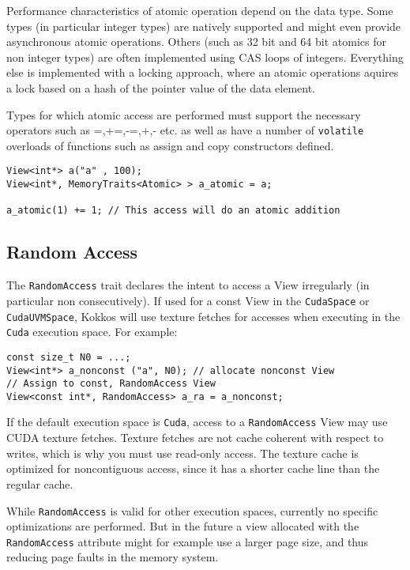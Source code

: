 Performance characteristics of atomic operation depend on the data type. 
Some types (in particular integer types) are natively supported and might even provide 
asynchronous atomic operations. Others (such as 32 bit and 64 bit atomics for non 
integer types) are often implemented using CAS loops of integers. 
Everything else is implemented with a locking approach, where an atomic operations 
aquires a lock based on a hash of the pointer value of the data element.  

Types for which atomic access are performed must support the 
necessary operators such as =,+=,-=,+,- etc. as well as have a number of \lstinline|volatile|
overloads of functions such as assign and copy constructors defined. 

\begin{lstlisting}
View<int*> a("a" , 100);
View<int*, MemoryTraits<Atomic> > a_atomic = a;

a_atomic(1) += 1; // This access will do an atomic addition
\end{lstlisting} 

\subsection{Random Access}

The \lstinline|RandomAccess| trait declares the intent to access a View
irregularly (in particular non consecutively). If used for a const View 
in the \lstinline|CudaSpace| or \lstinline|CudaUVMSpace|, Kokkos will use 
texture fetches for accesses when executing in the \lstinline|Cuda| execution
space.
For example:
\begin{lstlisting}
const size_t N0 = ...;
View<int*> a_nonconst ("a", N0); // allocate nonconst View
// Assign to const, RandomAccess View
View<const int*, RandomAccess> a_ra = a_nonconst;
\end{lstlisting}
If the default execution space is \lstinline!Cuda!, access to a
\lstinline!RandomAccess! View may use CUDA texture fetches.  Texture
fetches are not cache coherent with respect to writes, which is why
you must use read-only access.  The texture cache is optimized for
noncontiguous access, since it has a shorter cache line than the
regular cache.

While \lstinline!RandomAccess! is valid for other execution spaces, 
currently no specific optimizations are performed. But in the future a view
allocated with the \lstinline!RandomAccess! attribute might for example
use a larger page size, and thus reducing page faults in the memory 
system.

